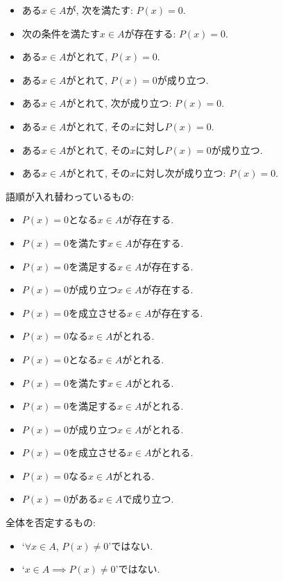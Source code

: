 \documentclass[a4paper,12pt,draft]{amsart}
\begin{document}
\begin{itemize}
\item ある$x\in A$が, 次を満たす: $P(x)=0$.
\item 次の条件を満たす$x\in A$が存在する: $P(x)=0$.
\item ある$x\in A$がとれて, $P(x)=0$.
\item ある$x\in A$がとれて, $P(x)=0$が成り立つ.
\item ある$x\in A$がとれて, 次が成り立つ: $P(x)=0$.
\item ある$x\in A$がとれて, その$x$に対し$P(x)=0$.
\item ある$x\in A$がとれて, その$x$に対し$P(x)=0$が成り立つ.
\item ある$x\in A$がとれて, その$x$に対し次が成り立つ: $P(x)=0$.
\end{itemize}
語順が入れ替わっているもの:
\begin{itemize}
\item $P(x)=0$となる$x\in A$が存在する.
\item $P(x)=0$を満たす$x\in A$が存在する.
\item $P(x)=0$を満足する$x\in A$が存在する.
\item $P(x)=0$が成り立つ$x\in A$が存在する.
\item $P(x)=0$を成立させる$x\in A$が存在する.
\item $P(x)=0$なる$x\in A$がとれる.
\item $P(x)=0$となる$x\in A$がとれる.
\item $P(x)=0$を満たす$x\in A$がとれる.
\item $P(x)=0$を満足する$x\in A$がとれる.
\item $P(x)=0$が成り立つ$x\in A$がとれる.
\item $P(x)=0$を成立させる$x\in A$がとれる.
\item $P(x)=0$なる$x\in A$がとれる.
\item $P(x)=0$がある$x\in A$で成り立つ.
\end{itemize}
全体を否定するもの:
\begin{itemize}
\item `$\forall x \in A$, $P(x)\neq 0$'ではない.
\item `$x \in A\implies P(x)\neq 0$'ではない.
\end{itemize}
\end{document}
